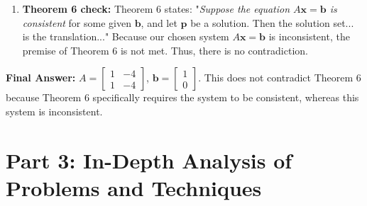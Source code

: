 \documentclass[11pt]{article}
\begin{document}
\begin{enumerate}
    If we pick a $\mathbf{b}$ that does not have equal components, say $\mathbf{b} = \begin{bmatrix} 1 \\ 0 \end{bmatrix}$, then $A\mathbf{x} = \mathbf{b}$ will have no solution. The empty set is not a line.
    \item \textbf{Theorem 6 check:} Theorem 6 states: "\textit{Suppose the equation $A\mathbf{x} = \mathbf{b}$ is consistent} for some given $\mathbf{b}$, and let $\mathbf{p}$ be a solution. Then the solution set... is the translation..." 
    Because our chosen system $A\mathbf{x} = \mathbf{b}$ is inconsistent, the premise of Theorem 6 is not met. Thus, there is no contradiction.
\end{enumerate}
\textbf{Final Answer:} $A = \begin{bmatrix} 1 & -4 \\ 1 & -4 \end{bmatrix}$, $\mathbf{b} = \begin{bmatrix} 1 \\ 0 \end{bmatrix}$. This does not contradict Theorem 6 because Theorem 6 specifically requires the system to be consistent, whereas this system is inconsistent.

\newpage
\section{Part 3: In-Depth Analysis of Problems and Techniques}
\end{document}
